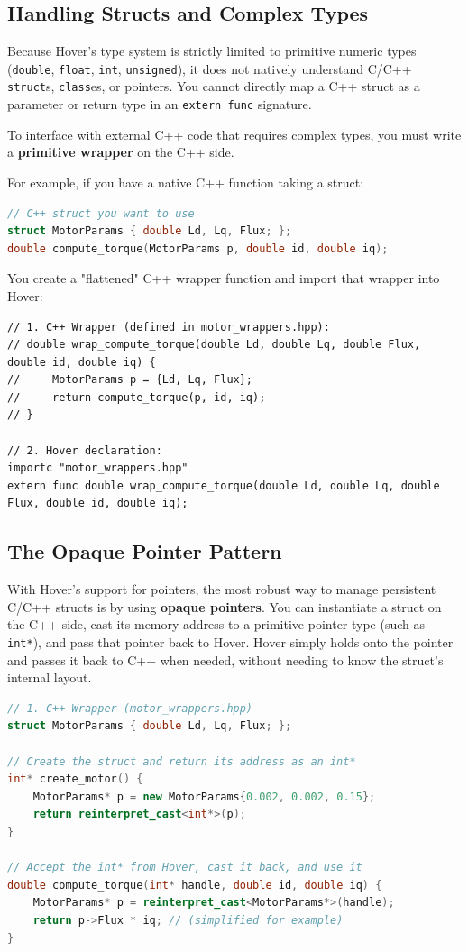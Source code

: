 \documentclass[11pt, a4paper]{article}
\newcommand{\code}[1]{\texttt{\small #1}}
\begin{document}
\subsection{Handling Structs and Complex Types}

Because Hover's type system is strictly limited to primitive numeric types (\code{double}, \code{float}, \code{int}, \code{unsigned}), it does not natively understand C/C++ \code{struct}s, \code{class}es, or pointers. You cannot directly map a C++ struct as a parameter or return type in an \code{extern func} signature.

To interface with external C++ code that requires complex types, you must write a \textbf{primitive wrapper} on the C++ side. 

For example, if you have a native C++ function taking a struct:
\begin{lstlisting}[language=C++]
// C++ struct you want to use
struct MotorParams { double Ld, Lq, Flux; };
double compute_torque(MotorParams p, double id, double iq);
\end{lstlisting}

You create a "flattened" C++ wrapper function and import that wrapper into Hover:
\begin{lstlisting}
// 1. C++ Wrapper (defined in motor_wrappers.hpp):
// double wrap_compute_torque(double Ld, double Lq, double Flux, double id, double iq) { 
//     MotorParams p = {Ld, Lq, Flux};
//     return compute_torque(p, id, iq); 
// }

// 2. Hover declaration:
importc "motor_wrappers.hpp"
extern func double wrap_compute_torque(double Ld, double Lq, double Flux, double id, double iq);
\end{lstlisting}

\subsection{The Opaque Pointer Pattern}

With Hover's support for pointers, the most robust way to manage persistent C/C++ structs is by using \textbf{opaque pointers}. You can instantiate a struct on the C++ side, cast its memory address to a primitive pointer type (such as \code{int*}), and pass that pointer back to Hover. Hover simply holds onto the pointer and passes it back to C++ when needed, without needing to know the struct's internal layout.

\begin{lstlisting}[language=C++]
// 1. C++ Wrapper (motor_wrappers.hpp)
struct MotorParams { double Ld, Lq, Flux; };

// Create the struct and return its address as an int*
int* create_motor() {
    MotorParams* p = new MotorParams{0.002, 0.002, 0.15};
    return reinterpret_cast<int*>(p);
}

// Accept the int* from Hover, cast it back, and use it
double compute_torque(int* handle, double id, double iq) {
    MotorParams* p = reinterpret_cast<MotorParams*>(handle);
    return p->Flux * iq; // (simplified for example)
}
\end{lstlisting}
\end{document}
